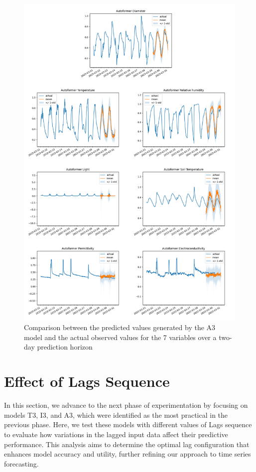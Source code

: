 \begin{figure}[htbp]
    \centering
    \includegraphics[width=15 cm]{6_ChapterResults/figuras/A3.png}
    \caption{Comparison between the predicted values generated by the A3 model and the actual observed values for the 7 variables over a two-day prediction horizon}
    \label{A3}
\end{figure}






\section{Effect of Lags Sequence}
In this section, we advance to the next phase of experimentation by focusing on models T3, I3, and A3, which were identified as the most practical in the previous phase. Here, we test these models with different values of Lags sequence to evaluate how variations in the lagged input data affect their predictive performance. This analysis aims to determine the optimal lag configuration that enhances model accuracy and utility, further refining our approach to time series forecasting.

